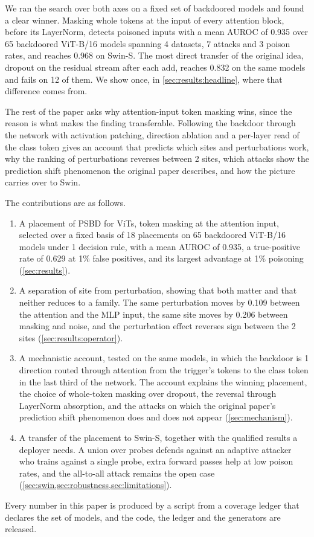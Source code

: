 We ran the search over both axes on a fixed set of backdoored models and found a clear winner. Masking whole tokens at the input of every attention block, before its LayerNorm, detects poisoned inputs with a mean AUROC of 0.935 over 65 backdoored ViT-B/16 models spanning 4 datasets, 7 attacks and 3 poison rates, and reaches 0.968 on Swin-S. The most direct transfer of the original idea, dropout on the residual stream after each add, reaches 0.832 on the same models and fails on 12 of them. We show once, in \cref{sec:results:headline}, where that difference comes from.

The rest of the paper asks why attention-input token masking wins, since the reason is what makes the finding transferable. Following the backdoor through the network with activation patching, direction ablation and a per-layer read of the class token gives an account that predicts which sites and perturbations work, why the ranking of perturbations reverses between 2 sites, which attacks show the prediction shift phenomenon the original paper describes, and how the picture carries over to Swin.

The contributions are as follows.
\begin{enumerate}
  \item A placement of PSBD for ViTs, token masking at the attention input, selected over a fixed basis of 18 placements on 65 backdoored ViT-B/16 models under 1 decision rule, with a mean AUROC of 0.935, a true-positive rate of 0.629 at 1\% false positives, and its largest advantage at 1\% poisoning (\cref{sec:results}).
  \item A separation of site from perturbation, showing that both matter and that neither reduces to a family. The same perturbation moves by 0.109 between the attention and the MLP input, the same site moves by 0.206 between masking and noise, and the perturbation effect reverses sign between the 2 sites (\cref{sec:results:operator}).
  \item A mechanistic account, tested on the same models, in which the backdoor is 1 direction routed through attention from the trigger's tokens to the class token in the last third of the network. The account explains the winning placement, the choice of whole-token masking over dropout, the reversal through LayerNorm absorption, and the attacks on which the original paper's prediction shift phenomenon does and does not appear (\cref{sec:mechanism}).
  \item A transfer of the placement to Swin-S, together with the qualified results a deployer needs. A union over probes defends against an adaptive attacker who trains against a single probe, extra forward passes help at low poison rates, and the all-to-all attack remains the open case (\cref{sec:swin,sec:robustness,sec:limitations}).
\end{enumerate}
Every number in this paper is produced by a script from a coverage ledger that declares the set of models, and the code, the ledger and the generators are released.
